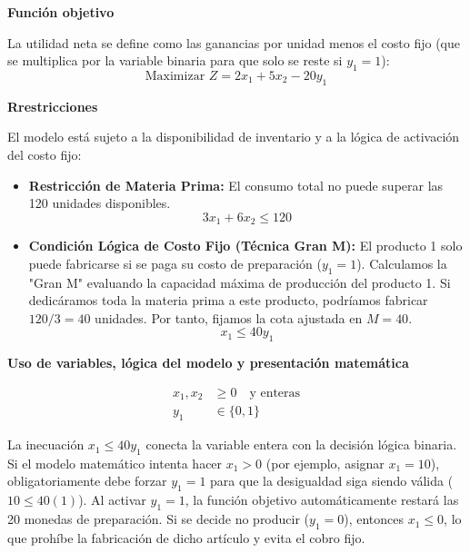 \documentclass[10pt,a4paper]{article}
\begin{document}
\vspace{3mm}
\textbf{Función objetivo}

La utilidad neta se define como las ganancias por unidad menos el costo fijo (que se multiplica por la variable binaria para que solo se reste si $y_1 = 1$):
\[ \text{Maximizar } Z = 2x_1 + 5x_2 - 20y_1 \]

\vspace{3mm}
\textbf{Rrestricciones}

El modelo está sujeto a la disponibilidad de inventario y a la lógica de activación del costo fijo:

\begin{itemize}
    \item \textbf{Restricción de Materia Prima:} El consumo total no puede superar las 120 unidades disponibles.
    \[ 3x_1 + 6x_2 \le 120 \]

    \item \textbf{Condición Lógica de Costo Fijo (Técnica Gran M):} El producto 1 solo puede fabricarse si se paga su costo de preparación ($y_1 = 1$). Calculamos la "Gran M" evaluando la capacidad máxima de producción del producto 1. Si dedicáramos toda la materia prima a este producto, podríamos fabricar $120 / 3 = 40$ unidades. Por tanto, fijamos la cota ajustada en $M = 40$.
    \[ x_1 \le 40y_1 \]
\end{itemize}

\vspace{3mm}
\textbf{Uso de variables, lógica del modelo y presentación matemática}

\begin{align*}
    x_1, x_2 &\ge 0 \quad \text{y enteras} \\
    y_1 &\in \{0, 1\}
\end{align*}

\begin{nota}{}
La inecuación $x_1 \le 40y_1$ conecta la variable entera con la decisión lógica binaria. Si el modelo matemático intenta hacer $x_1 > 0$ (por ejemplo, asignar $x_1 = 10$), obligatoriamente debe forzar $y_1 = 1$ para que la desigualdad siga siendo válida ($10 \le 40(1)$). Al activar $y_1 = 1$, la función objetivo automáticamente restará las 20 monedas de preparación. Si se decide no producir ($y_1 = 0$), entonces $x_1 \le 0$, lo que prohíbe la fabricación de dicho artículo y evita el cobro fijo.
\end{nota}

\newpage
\end{document}
